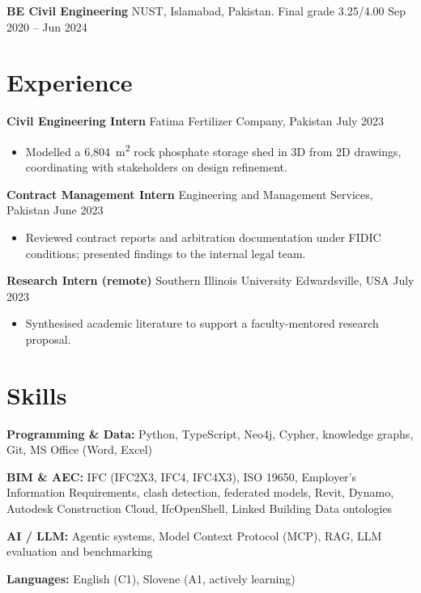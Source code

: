 \documentclass[a4paper,10.5pt]{article}
\newcommand{\datefill}{\dotfill}
\newcommand{\entry}[3]{\vspace{2.5pt}\noindent\textbf{#1} \textbar{} #2 \datefill{} #3\par\vspace{0.5pt}}
\newcommand{\skillrow}[2]{\noindent\textbf{#1:} #2\par\vspace{1pt}}
\begin{document}
\entry{BE Civil Engineering}{NUST, Islamabad, Pakistan. Final grade 3.25/4.00}{Sep 2020 -- Jun 2024}

\section{Experience}
\entry{Civil Engineering Intern}{Fatima Fertilizer Company, Pakistan}{July 2023}
\begin{itemize}
  \item Modelled a 6,804~m\textsuperscript{2} rock phosphate storage shed in 3D from
        2D drawings, coordinating with stakeholders on design refinement.
\end{itemize}

\entry{Contract Management Intern}{Engineering and Management Services, Pakistan}{June 2023}
\begin{itemize}
  \item Reviewed contract reports and arbitration documentation under FIDIC
        conditions; presented findings to the internal legal team.
\end{itemize}

\entry{Research Intern (remote)}{Southern Illinois University Edwardsville, USA}{July 2023}
\begin{itemize}
  \item Synthesised academic literature to support a faculty-mentored research proposal.
\end{itemize}

\section{Skills}

\skillrow{Programming \& Data}{Python, TypeScript, Neo4j, Cypher, knowledge graphs, Git, MS Office (Word, Excel)}
\skillrow{BIM \& AEC}{IFC (IFC2X3, IFC4, IFC4X3), ISO 19650, Employer's Information Requirements, clash detection, federated models, Revit, Dynamo, Autodesk Construction Cloud, IfcOpenShell, Linked Building Data ontologies}
\skillrow{AI / LLM}{Agentic systems, Model Context Protocol (MCP), RAG, LLM evaluation and benchmarking}

\skillrow{Languages}{English (C1), Slovene (A1, actively learning)}
\end{document}
